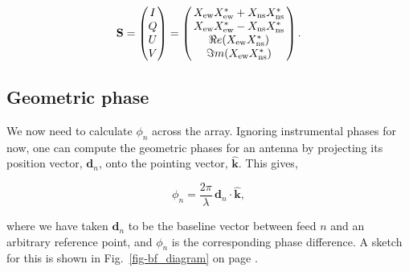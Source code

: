 \begin{equation}
\mathbf{S} = 
\begin{pmatrix}
I \\ 
Q \\ 
U\\ 
V
\end{pmatrix}
= \begin{pmatrix}
\, X_{\rm ew} X_{\rm ew}^* + X_{\rm ns} X_{\rm ns}^*\, \\ 
\, X_{\rm ew} X_{\rm ew}^* - X_{\rm ns} X_{\rm ns}^* \,\\ 
\, \Re e(X_{\rm ew} X_{\rm ns}^*)\,\\ 
\, \Im m(X_{\rm ew} X_{\rm ns}^*)\,
\end{pmatrix}.
\end{equation}


\subsection{Geometric phase}

We now need to calculate $\phi_n$ across the array.
Ignoring instrumental phases for now, one can compute the geometric 
phases for an antenna by projecting its position vector, $\mathbf{d}_n$, 
onto the pointing vector, $\hat{\mathbf{k}}$. This gives,

\begin{equation}
\label{eqn-phi_n}
\phi_n = \frac{2\pi}{\lambda} \, \mathbf{d}_n \cdot  {\mathbf{\hat{k}}},
\end{equation}

\noindent where we have taken $\mathbf{d}_n$ to be the baseline vector between 
feed $n$ and an arbitrary reference point, and $\phi_n$ is the corresponding 
phase difference. A sketch for this is shown in 
Fig.~\ref{fig-bf_diagram} on page 
\pageref{fig-bf_diagram}.


